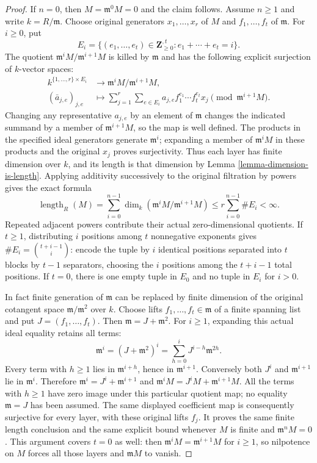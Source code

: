 \begin{proof}
If $n=0$, then $M=\mathfrak m^0M=0$ and the claim follows.
Assume $n\geq1$ and write $k=R/\mathfrak m$.
Choose original generators $x_1,\ldots,x_r$ of $M$ and
$f_1,\ldots,f_t$ of $\mathfrak m$. For $i\geq0$, put
$$
E_i=\{(e_1,\ldots,e_t)\in\mathbf Z_{\geq0}^{,t}:
e_1+\cdots+e_t=i\}.
$$
The quotient $\mathfrak m^iM/\mathfrak m^{i+1}M$ is killed
by $\mathfrak m$ and has the following explicit surjection
of $k$-vector spaces:
$$
\begin{aligned}
k^{\{1,\ldots,r\}\times E_i}&\longrightarrow
\mathfrak m^iM/\mathfrak m^{i+1}M,\\
(\bar a_{j,e})_{j,e}&\longmapsto
\sum_{j=1}^r\sum_{e\in E_i}
a_{j,e} f_1^{e_1}\cdots f_t^{e_t}x_j
\pmod{\mathfrak m^{i+1}M}.
\end{aligned}
$$
Changing any representative $a_{j,e}$ by an element of
$\mathfrak m$ changes the indicated summand by a member of
$\mathfrak m^{i+1}M$, so the map is well defined. The products
in the specified ideal generators generate $\mathfrak m^i$;
expanding a member of $\mathfrak m^iM$ in these products and
the original $x_j$ proves surjectivity. Thus each layer has
finite dimension over $k$, and its length is that dimension by
Lemma \ref{lemma-dimension-is-length}. Applying additivity
successively to the original filtration by powers gives the exact formula
$$
\operatorname{length}_R(M)
=\sum_{i=0}^{n-1}\dim_k
 (\mathfrak m^iM/\mathfrak m^{i+1}M)
\leq r\sum_{i=0}^{n-1}\#E_i<\infty.
$$
Repeated adjacent powers contribute their actual zero-dimensional
quotients. If $t\geq1$, distributing $i$ positions among $t$
nonnegative exponents gives $\#E_i=\binom{t+i-1}{i}$: encode
the tuple by $i$ identical positions separated into $t$ blocks
by $t-1$ separators, choosing the $i$ positions among the
$t+i-1$ total positions. If $t=0$, there is one empty tuple
in $E_0$ and no tuple in $E_i$ for $i>0$.

In fact finite generation of $\mathfrak m$ can be replaced by
finite dimension of the original cotangent space
$\mathfrak m/\mathfrak m^2$ over $k$.
Choose lifts $f_1,\ldots,f_t\in\mathfrak m$ of a finite
spanning list and put $J=(f_1,\ldots,f_t)$.
Then $\mathfrak m=J+\mathfrak m^2$.
For $i\geq1$, expanding this actual ideal equality retains all terms:
$$
\mathfrak m^i
=(J+\mathfrak m^2)^i
=\sum_{h=0}^i J^{i-h}\mathfrak m^{2h}.
$$
Every term with $h\geq1$ lies in $\mathfrak m^{i+h}$,
hence in $\mathfrak m^{i+1}$. Conversely both $J^i$ and
$\mathfrak m^{i+1}$ lie in $\mathfrak m^i$. Therefore
$\mathfrak m^i=J^i+\mathfrak m^{i+1}$ and
$\mathfrak m^iM=J^iM+\mathfrak m^{i+1}M$.
All the terms with $h\geq1$ have zero image under this particular
quotient map; no equality $\mathfrak m=J$ has been assumed.
The same displayed coefficient map is consequently surjective
for every layer, with these original lifts $f_j$.
It proves the same finite length conclusion and the same explicit
bound whenever $M$ is finite and $\mathfrak m^nM=0$.
This argument covers $t=0$ as well: then
$\mathfrak m^iM=\mathfrak m^{i+1}M$ for $i\geq1$, so
nilpotence on $M$ forces all those layers and $\mathfrak mM$ to vanish.
\end{proof}


